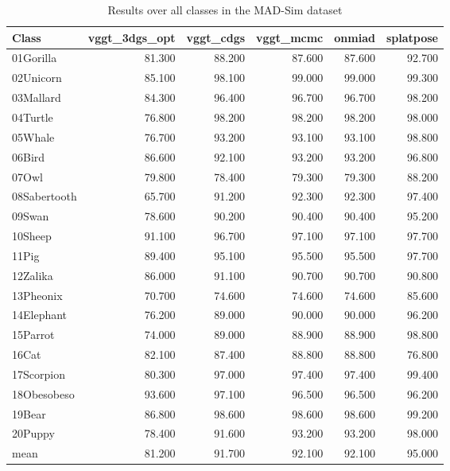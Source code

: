 \begin{table}[!htbp]
\centering
\scriptsize
\setlength{\tabcolsep}{4pt}
\renewcommand{\arraystretch}{0.95}
\begin{tabular}{l r r r r r}
\toprule
\textbf{Class} & \textbf{vggt\_3dgs\_opt} & \textbf{vggt\_cdgs} & \textbf{vggt\_mcmc} & \textbf{onmiad} & \textbf{splatpose} \\
\midrule
01Gorilla & 81.300 & 88.200 & 87.600 & 87.600 & 92.700 \\
02Unicorn & 85.100 & 98.100 & 99.000 & 99.000 & 99.300 \\
03Mallard & 84.300 & 96.400 & 96.700 & 96.700 & 98.200 \\
04Turtle & 76.800 & 98.200 & 98.200 & 98.200 & 98.000 \\
05Whale & 76.700 & 93.200 & 93.100 & 93.100 & 98.800 \\
06Bird & 86.600 & 92.100 & 93.200 & 93.200 & 96.800 \\
07Owl & 79.800 & 78.400 & 79.300 & 79.300 & 88.200 \\
08Sabertooth & 65.700 & 91.200 & 92.300 & 92.300 & 97.400 \\
09Swan & 78.600 & 90.200 & 90.400 & 90.400 & 95.200 \\
10Sheep & 91.100 & 96.700 & 97.100 & 97.100 & 97.700 \\
11Pig & 89.400 & 95.100 & 95.500 & 95.500 & 97.700 \\
12Zalika & 86.000 & 91.100 & 90.700 & 90.700 & 90.800 \\
13Pheonix & 70.700 & 74.600 & 74.600 & 74.600 & 85.600 \\
14Elephant & 76.200 & 89.000 & 90.000 & 90.000 & 96.200 \\
15Parrot & 74.000 & 89.000 & 88.900 & 88.900 & 98.800 \\
16Cat & 82.100 & 87.400 & 88.800 & 88.800 & 76.800 \\
17Scorpion & 80.300 & 97.000 & 97.400 & 97.400 & 99.400 \\
18Obesobeso & 93.600 & 97.100 & 96.500 & 96.500 & 96.200 \\
19Bear & 86.800 & 98.600 & 98.600 & 98.600 & 99.200 \\
20Puppy & 78.400 & 91.600 & 93.200 & 93.200 & 98.000 \\
\midrule
mean & 81.200 & 91.700 & 92.100 & 92.100 & 95.000 \\
\bottomrule
\end{tabular}
\caption{Results over all classes in the MAD-Sim dataset}
\label{tab:results\_mad}
\end{table}